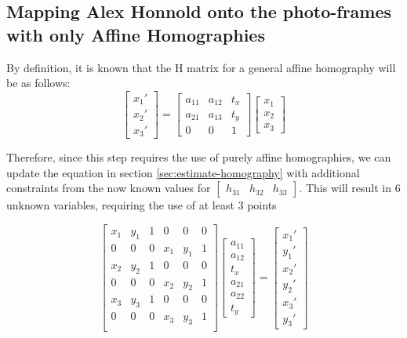 \documentclass{article}
\begin{document}
\subsection{Mapping Alex Honnold onto the photo-frames with only Affine Homographies}
By definition, it is known that the H matrix for a general affine homography will be as follows:
\[\begin{bmatrix}
    x_1' \\ x_2' \\ x_3'
\end{bmatrix} = 
\begin{bmatrix}
    a_{11} & a_{12} & t_x \\
    a_{21} & a_{13} & t_y \\
    0 & 0 & 1
\end{bmatrix} \begin{bmatrix}
    x_1 \\ x_2 \\ x_3
\end{bmatrix}
\]

Therefore, since this step requires the use of purely affine homographies, we can update the equation in section \ref{sec:estimate-homography} with additional constraints from the now known values for \(\begin{bmatrix}
    h_{31} & h_{32} & h_{33}
\end{bmatrix}\). This will result in 6 unknown variables, requiring the use of at least 3 points

\[\begin{bmatrix}
    x_1 & y_1 & 1 & 0 & 0 & 0 \\
    0 & 0 & 0 & x_1 & y_1 & 1 \\
    x_2 & y_2 & 1 & 0 & 0 & 0 \\
    0 & 0 & 0 & x_2 & y_2 & 1 \\
    x_3 & y_3 & 1 & 0 & 0 & 0 \\
    0 & 0 & 0 & x_3 & y_3 & 1 \\
\end{bmatrix} \begin{bmatrix}
    a_{11} \\ a_{12} \\ t_x \\ a_{21} \\ a_{22} \\ t_{y}
\end{bmatrix} = \begin{bmatrix}
    x_1' \\ y_1' \\ x_2' \\ y_2' \\ x_3' \\ y_3'
\end{bmatrix}\]
\end{document}
